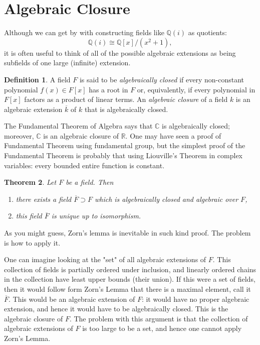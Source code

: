 \documentclass[12pt]{report}
\newtheorem{theorem}{Theorem}[section]
\theoremstyle{definition}
\newtheorem{definition}[theorem]{Definition}
\newcommand{\CC}{\mathbb{C}}
\newcommand{\QQ}{\mathbb{Q}}
\newcommand{\RR}{\mathbb{R}}
\begin{document}
\section{Algebraic Closure}

Although we can get by with constructing fields like $\QQ(i)$ as quotients:
$$\QQ(i) \cong \QQ[x]/(x^2 + 1),$$
it is often useful to think of all of the possible algebraic extensions as being subfields of one large (infinite) extension.

\begin{definition}
	A field $F$ is said to be \emph{algebraically closed} if every non-constant polynomial $f(x) \in F[x]$ has a root in $F$ or, equivalently, if every polynomial in $F[x]$ factors as a product of linear terms. An \emph{algebraic closure} of a field $k$ is an algebraic extension $\overline{k}$ of $k$ that is algebraically closed.
\end{definition}

The Fundamental Theorem of Algebra says that $\CC$ is algebraically closed; moreover, $\CC$ is an algebraic closure of $\RR$. One may have seen a proof of Fundamental Theorem using fundamental group, but the simplest proof of the Fundamental Theorem is probably that using Liouville's Theorem in complex variables: every bounded entire function is constant.

\begin{theorem}\label{ac}
	Let $F$ be a field. Then \begin{enumerate}
		\item there exists a field $\overline{F}\supset F$ which is algebraically closed and algebraic over $F$,
		\item this field $\overline{F}$ is unique up to isomorphism.
	\end{enumerate}
\end{theorem}

As you might guess, Zorn's lemma is inevitable in such kind proof. The problem is how to apply it.

One can imagine looking at the "set" of all algebraic extensions of $F$. This collection of fields is partially ordered under inclusion, and linearly ordered chains in the collection have least upper bounds (their union). If this were a set of fields, then it would follow form Zorn's Lemma that there is a maximal element, call it $\overline{F}$. This would be an algebraic extension of $F$: it would have no proper algebraic extension, and hence it would have to be algebraically closed. This is the algebraic closure of $F$. The problem with this argument is that the collection of algebraic extensions of $F$ is too large to be a set, and hence one cannot apply Zorn's Lemma.
\end{document}
